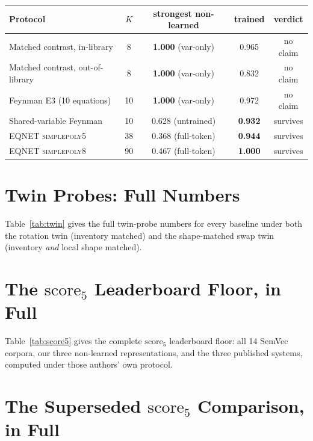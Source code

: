 \begin{center}\small
\begin{tabular}{l c c c c}
\toprule
Protocol & $K$ & strongest non-learned & trained & verdict \\
\midrule
Matched contrast, in-library      & 8  & \textbf{1.000} (var-only)   & 0.965 & no claim \\
Matched contrast, out-of-library  & 8  & \textbf{1.000} (var-only)   & 0.832 & no claim \\
Feynman E3 (10 equations)         & 10 & \textbf{1.000} (var-only)   & 0.972 & no claim \\
Shared-variable Feynman           & 10 & 0.628 (untrained)           & \textbf{0.932} & survives \\
EQNET \textsc{simplepoly5}        & 38 & 0.368 (full-token)          & \textbf{0.944} & survives \\
EQNET \textsc{simplepoly8}        & 90 & 0.467 (full-token)          & \textbf{1.000} & survives \\
\bottomrule
\end{tabular}
\end{center}


\section{Twin Probes: Full Numbers}
\label{app:twin}

Table~\ref{tab:twin} gives the full twin-probe numbers for every baseline under both the rotation
twin (inventory matched) and the shape-matched swap twin (inventory \emph{and} local shape matched).



\section{The $\mathrm{score}_5$ Leaderboard Floor, in Full}
\label{app:score5}

Table~\ref{tab:score5} gives the complete $\mathrm{score}_5$ leaderboard floor: all 14 SemVec
corpora, our three non-learned representations, and the three published systems, computed under
those authors' own protocol.



\section{The Superseded $\mathrm{score}_5$ Comparison, in Full}
\label{app:retraction}

